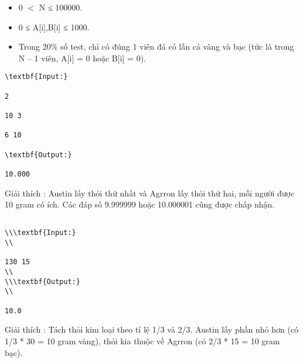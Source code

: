 \begin{itemize}
	\item     0 $<$ N ≤ 100000.   
	\item     0 ≤ A[i],B[i] ≤ 1000.   
	\item     Trong 20\% số test, chỉ có đúng 1 viên đá có lẫn cả vàng và bạc (tức là trong N – 1 viên, A[i] = 0 hoặc B[i] = 0).   
\end{itemize}
\begin{verbatim}
\textbf{Input:}

2

10 3

6 10

\textbf{Output:}

10.000\end{verbatim}

Giải thích        : Austin lấy thỏi thứ nhất và Agrron lấy thỏi thứ hai, mỗi người được 10 gram có ích. Các đáp số 9.999999 hoặc 10.000001 cũng được chấp nhận.
\begin{verbatim}

\\\textbf{Input:}
\\

130 15
\\
\\\textbf{Output:}
\\

10.0\end{verbatim}

Giải thích        : Tách thỏi kim loại theo tỉ lệ 1/3 và 2/3. Austin lấy phần nhỏ hơn (có 1/3 * 30 = 10 gram vàng), thỏi kia thuộc về Agrron (có 2/3 * 15 = 10 gram bạc).